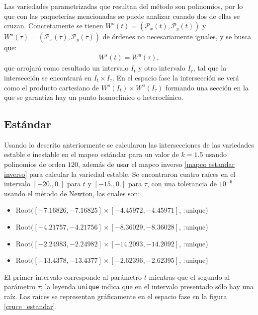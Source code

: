 Las variedades parametrizadas que resultan del método son polinomios, por lo que con las paqueterías  mencionadas se puede analizar cuando dos de ellas se cruzan. Concretamente se tienen  $W^{s}(t)=(\mathcal{P}_{x}(t),\mathcal{P}_{y}(t))$ y $W^{u}(\tau)=(\mathcal{P}_{x}(\tau),\mathcal{P}_{y}(\tau))$ de órdenes no necesariamente iguales, y se busca que:
\begin{eqnarray}
W^{s}(t)=W^{u}(\tau),
\end{eqnarray}
que arrojará como resultado un intervalo $I_{t}$ y otro intervalo $I_{\tau}$, tal que la intersección se encontrará en $I_{t}\times I_{\tau}$. En el espacio fase la intersección se verá como el producto cartesiano de $W^{s}(I_{t})\times W^{u}(I_{\tau})$ formando una sección en la que se garantiza hay un punto homoclínico o heteroclínico. 


\subsection{Estándar}
Usando lo descrito anteriormente se calcularon las intersecciones de las variedades estable e inestable en el mapeo estándar para un valor de $k=1.5$ usando polinomios de orden $120$, además de usar el mapeo inverso \eqref{mapeo estandar inverso} para calcular la variedad estable. Se encontraron cuatro raíces en el intervalo $[-20.,0.]$ para $t$  y $[-15.,0.]$ para $\tau$, con una tolerancia de $10^{-6}$ usando el método de Newton, las cuales son:
\begin{itemize}
\item Root$([-7.16826, -7.16825] \times [-4.45972, -4.45971]$, :unique)
\item Root$([-4.21757, -4.21756] \times [-8.36029, -8.36028]$, :unique)
\item Root$([-2.24983, -2.24982] \times [-14.2093, -14.2092]$, :unique)
\item Root$([-13.4378, -13.4377] \times [-2.62396, -2.62395]$, :unique)
\end{itemize}
El primer intervalo corresponde al parámetro $t$ mientras que el segundo al parámetro $\tau$; la leyenda \texttt{unique} indica que en el intervalo presentado sólo hay una raíz. Las raíces se representan gráficamente en el espacio fase en la figura \ref{cruce_estandar}. 

